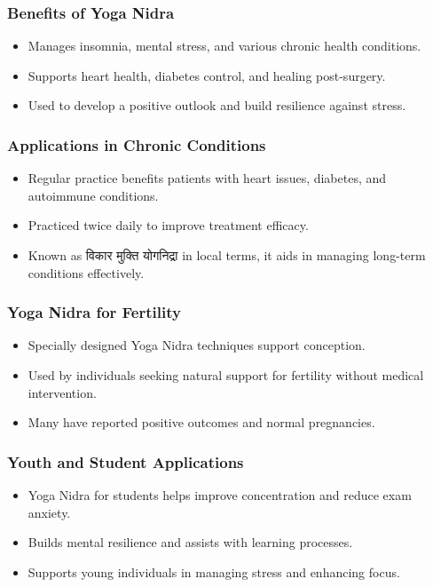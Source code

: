 \begin{frame}[fragile]\frametitle{Benefits of Yoga Nidra}
    \begin{itemize}
        \item Manages insomnia, mental stress, and various chronic health conditions.
        \item Supports heart health, diabetes control, and healing post-surgery.
        \item Used to develop a positive outlook and build resilience against stress.
    \end{itemize}
\end{frame}

\begin{frame}[fragile]\frametitle{Applications in Chronic Conditions}
    \begin{itemize}
        \item Regular practice benefits patients with heart issues, diabetes, and autoimmune conditions.
        \item Practiced twice daily to improve treatment efficacy.
        \item Known as विकार मुक्ति योगनिद्रा in local terms, it aids in managing long-term conditions effectively.
    \end{itemize}
\end{frame}

\begin{frame}[fragile]\frametitle{Yoga Nidra for Fertility}
    \begin{itemize}
        \item Specially designed Yoga Nidra techniques support conception.
        \item Used by individuals seeking natural support for fertility without medical intervention.
        \item Many have reported positive outcomes and normal pregnancies.
    \end{itemize}
\end{frame}

\begin{frame}[fragile]\frametitle{Youth and Student Applications}
    \begin{itemize}
        \item Yoga Nidra for students helps improve concentration and reduce exam anxiety.
        \item Builds mental resilience and assists with learning processes.
        \item Supports young individuals in managing stress and enhancing focus.
    \end{itemize}
\end{frame}

